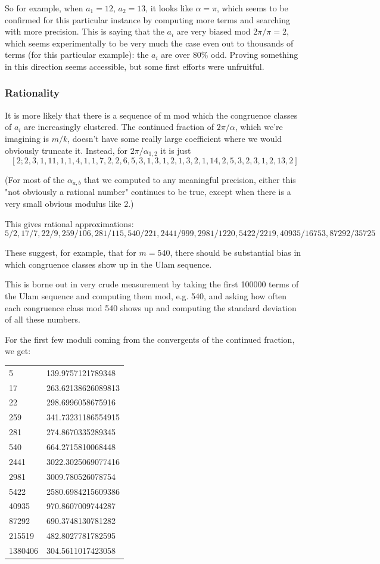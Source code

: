 \documentclass{article}
\theoremstyle{definition}
\theoremstyle{remark}
\numberwithin{equation}{section}
\begin{document}
So for example, when $a_1 = 12$, $a_2 = 13$, it looks like
$\alpha = \pi$, which seems to be confirmed for this particular
instance by computing more terms and searching with more
precision. This is saying that the $a_i$ are very biased mod
$2\pi/\pi = 2$, which seems experimentally to be very much the case
even out to thousands of terms (for this particular example): the
$a_i$ are over 80\% odd. Proving something in this direction seems
accessible, but some first efforts were unfruitful.

\subsubsection{Rationality}


It is more likely that there is a sequence of m mod which the
congruence classes of $a_i$ are increasingly clustered.  The continued
fraction of $2\pi/\alpha$, which we're imagining is $m/k$, doesn't have some
really large coefficient where we would obviously truncate it.
Instead, for $2\pi/\alpha_{1,2}$ it is just
\[[2; 2, 3, 1, 11, 1, 1, 4, 1, 1, 7, 2, 2, 6, 5, 3, 1, 3, 1, 2, 1, 3, 2, 1, 14, 2, 5, 3, 2, 3, 1, 2, 13, 2]\]

(For most of the $\alpha_{a,b}$ that we computed to any meaningful
precision, either this "not obviously a rational number" continues to
be true, except when there is a very small obvious modulus like 2.)

This gives rational approximations: 
\[5/2, 17/7, 22/9, 259/106, 281/115, 540/221, 2441/999, 2981/1220, 5422/2219, 40935/16753, 87292/35725\]

These suggest, for example, that for $m = 540$, there should be
substantial bias in which congruence classes show up in the Ulam
sequence.

This is borne out in very crude measurement by taking the first
100000 terms of the Ulam sequence and computing them mod, e.g. 540, and
asking how often each congruence class mod 540 shows up and computing
the standard deviation of all these numbers.

For the first few moduli coming from the convergents of the continued
fraction, we get:

\begin{tabular}{ll}
5 & 139.9757121789348\\
17 & 263.62138626089813\\
22 & 298.6996058675916\\
259 & 341.73231186554915\\
281 & 274.8670335289345\\
540 & 664.2715810068448\\
2441 & 3022.3025069077416\\
2981 & 3009.780526078754\\
5422 & 2580.6984215609386\\
40935 & 970.8607009744287\\
87292 & 690.3748130781282\\
215519 & 482.8027781782595\\
1380406 & 304.5611017423058
\end{tabular}
\end{document}
